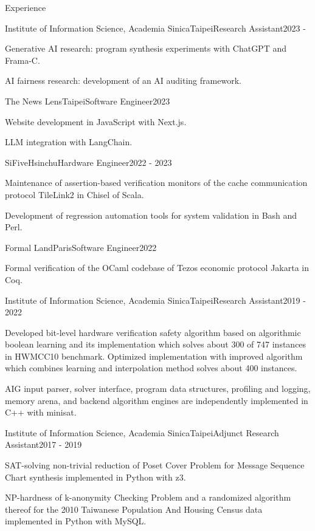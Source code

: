 \documentclass{resume} %
\begin{document}
\begin{rSection}{Experience}

\begin{rSubsection}{Institute of Information Science, Academia Sinica}{Taipei}{Research Assistant}{2023 - }
\item Generative AI research: program synthesis experiments with ChatGPT and Frama-C.
\item AI fairness research: development of an AI auditing framework.
\end{rSubsection}

\begin{rSubsection}{The News Lens}{Taipei}{Software Engineer}{2023}
\item Website development in JavaScript with Next.js.
\item LLM integration with LangChain.
\end{rSubsection}

\begin{rSubsection}{SiFive}{Hsinchu}{Hardware Engineer}{2022 - 2023}
\item Maintenance of assertion-based verification monitors of the cache communication protocol TileLink2 in Chisel of Scala.
\item Development of regression automation tools for system validation in Bash and Perl.
\end{rSubsection}

\begin{rSubsection}{Formal Land}{Paris}{Software Engineer}{2022}
\item Formal verification of the OCaml codebase of Tezos economic protocol Jakarta in Coq.
\end{rSubsection}

\begin{rSubsection}{Institute of Information Science, Academia Sinica}{Taipei}{Research Assistant}{2019 - 2022}
\item Developed bit-level hardware verification safety algorithm based on algorithmic boolean learning and
its implementation which solves about 300 of 747 instances in HWMCC10 benchmark.
Optimized implementation with improved algorithm which combines learning and interpolation method solves about 400 instances.
\item AIG input parser, solver interface, program data structures, profiling and logging,
memory arena, and backend algorithm engines are independently implemented in C++ with minisat.
\end{rSubsection}

\begin{rSubsection}{Institute of Information Science, Academia Sinica}{Taipei}{Adjunct Research Assistant}{2017 - 2019}
\item SAT-solving non-trivial reduction of Poset Cover Problem for Message Sequence Chart synthesis implemented in Python with z3.
\item NP-hardness of k-anonymity Checking Problem and a randomized algorithm thereof for the 2010 Taiwanese Population And Housing Census data implemented in Python with MySQL.
\end{rSubsection}

\end{rSection}
\end{document}
